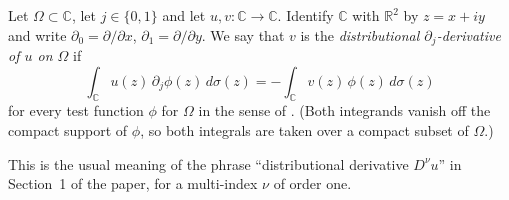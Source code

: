 \begin{definition}
Let $\Omega\subset\mathbb{C}$, let $j\in\{0,1\}$ and let
$u,v\colon\mathbb{C}\to\mathbb{C}$.  Identify $\mathbb{C}$ with $\mathbb{R}^2$
by $z=x+iy$ and write $\partial_0=\partial/\partial x$,
$\partial_1=\partial/\partial y$.  We say that $v$ is the
\emph{distributional $\partial_j$-derivative of $u$ on $\Omega$} if
\[
  \int_{\mathbb{C}}u(z)\,\partial_j\phi(z)\,d\sigma(z)
  =-\int_{\mathbb{C}}v(z)\,\phi(z)\,d\sigma(z)
\]
for every test function $\phi$ for $\Omega$ in the sense of
.  (Both integrands vanish off the compact support of
$\phi$, so both integrals are taken over a compact subset of $\Omega$.)

This is the usual meaning of the phrase ``distributional derivative
$D^\nu u$'' in Section~1 of the paper, for a multi-index $\nu$ of order one.
\end{definition}
